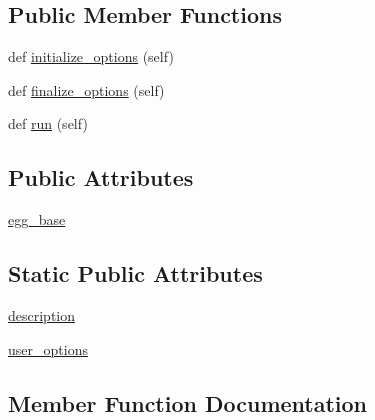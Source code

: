 \subsection*{Public Member Functions}
\begin{DoxyCompactItemize}
\item 
def \hyperlink{classsetuptools_1_1command_1_1dist__info_1_1dist__info_a5446b8943ce08261eab3935e7307b330}{initialize\+\_\+options} (self)
\item 
def \hyperlink{classsetuptools_1_1command_1_1dist__info_1_1dist__info_a7536d2a9045260747117f613a6305faa}{finalize\+\_\+options} (self)
\item 
def \hyperlink{classsetuptools_1_1command_1_1dist__info_1_1dist__info_a1b1026394e982e20a3c34c36d2a30e51}{run} (self)
\end{DoxyCompactItemize}
\subsection*{Public Attributes}
\begin{DoxyCompactItemize}
\item 
\hyperlink{classsetuptools_1_1command_1_1dist__info_1_1dist__info_a796157c75a15a432209243acd7c74774}{egg\+\_\+base}
\end{DoxyCompactItemize}
\subsection*{Static Public Attributes}
\begin{DoxyCompactItemize}
\item 
\hyperlink{classsetuptools_1_1command_1_1dist__info_1_1dist__info_a349341dc2e07669d281fc78a4a1d76a6}{description}
\item 
\hyperlink{classsetuptools_1_1command_1_1dist__info_1_1dist__info_ae6ee08acaff43d5d04b20a68942f8ef6}{user\+\_\+options}
\end{DoxyCompactItemize}


\subsection{Member Function Documentation}
\mbox{\label{classsetuptools_1_1command_1_1dist__info_1_1dist__info_a7536d2a9045260747117f613a6305faa}} 
